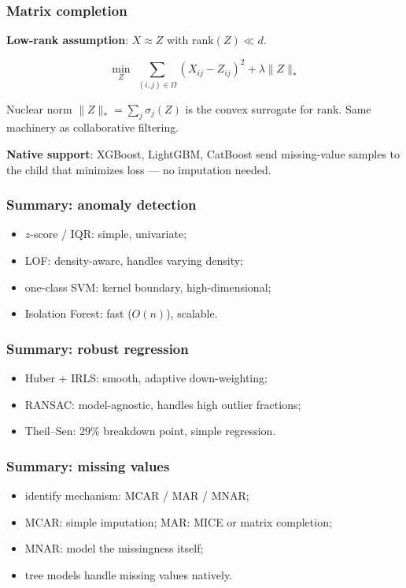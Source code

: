 \documentclass[]{beamer}
\begin{document}
\begin{frame}[fragile]
\frametitle{Matrix completion}
\textbf{Low-rank assumption}: $X \approx Z$ with $\mathrm{rank}(Z) \ll d$.

\begin{equation*}
\min_{Z}\;\sum_{(i,j)\in\Omega} \left(X_{ij} - Z_{ij}\right)^2 + \lambda\|Z\|_*
\end{equation*}

Nuclear norm $\|Z\|_* = \sum_j \sigma_j(Z)$ is the convex surrogate for rank. Same machinery as collaborative filtering.

\textbf{Native support}: XGBoost, LightGBM, CatBoost send missing-value samples to the child that minimizes loss --- no imputation needed.

\end{frame}

\begin{frame}[fragile]
\frametitle{Summary: anomaly detection}
\begin{itemize}
  \item $z$-score / IQR: simple, univariate;
  \item LOF: density-aware, handles varying density;
  \item one-class SVM: kernel boundary, high-dimensional;
  \item Isolation Forest: fast ($O(n)$), scalable.
\end{itemize}

\end{frame}

\begin{frame}[fragile]
\frametitle{Summary: robust regression}
\begin{itemize}
  \item Huber + IRLS: smooth, adaptive down-weighting;
  \item RANSAC: model-agnostic, handles high outlier fractions;
  \item Theil--Sen: 29\% breakdown point, simple regression.
\end{itemize}

\end{frame}

\begin{frame}[fragile]
\frametitle{Summary: missing values}
\begin{itemize}
  \item identify mechanism: MCAR / MAR / MNAR;
  \item MCAR: simple imputation; MAR: MICE or matrix completion;
  \item MNAR: model the missingness itself;
  \item tree models handle missing values natively.
\end{itemize}

\end{frame}
\end{document}
